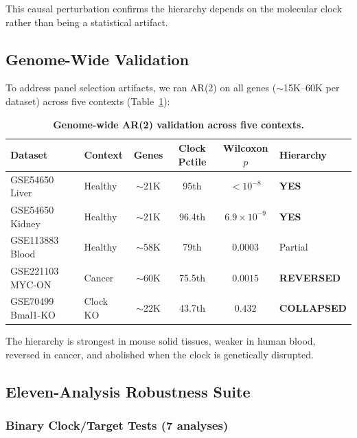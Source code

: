 \documentclass[11pt,a4paper]{article}
\begin{document}
This causal perturbation confirms the hierarchy depends on the molecular clock rather than being a statistical artifact.

\subsection{Genome-Wide Validation}

To address panel selection artifacts, we ran AR(2) on all genes ($\sim$15K--60K per dataset) across five contexts (Table~\ref{tab:genomewide}):

\begin{table}[H]
\centering
\caption{\textbf{Genome-wide AR(2) validation across five contexts.}}
\label{tab:genomewide}
\begin{tabular}{p{3cm}lcccl}
\toprule
Dataset & Context & Genes & Clock Pctile & Wilcoxon $p$ & Hierarchy \\
\midrule
GSE54650 Liver & Healthy & $\sim$21K & 95th & $<10^{-8}$ & \textbf{YES} \\
GSE54650 Kidney & Healthy & $\sim$21K & 96.4th & $6.9\times10^{-9}$ & \textbf{YES} \\
GSE113883 Blood & Healthy & $\sim$58K & 79th & $0.0003$ & Partial \\
GSE221103 MYC-ON & Cancer & $\sim$60K & 75.5th & $0.0015$ & \textbf{REVERSED} \\
GSE70499 Bmal1-KO & Clock KO & $\sim$22K & 43.7th & $0.432$ & \textbf{COLLAPSED} \\
\bottomrule
\end{tabular}
\end{table}

The hierarchy is strongest in mouse solid tissues, weaker in human blood, reversed in cancer, and abolished when the clock is genetically disrupted.

\subsection{Eleven-Analysis Robustness Suite}

\subsubsection*{Binary Clock/Target Tests (7 analyses)}
\end{document}
